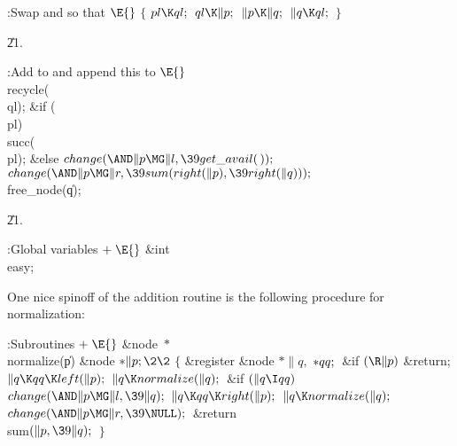 \B{}:Swap  and  so that \X${}\E{}$\6
${}\{{}$\1\6
${}\\{pl}\K\\{ql};{}$\6
${}\\{ql}\K\|p;{}$\6
${}\|p\K\|q;{}$\6
${}\|q\K\\{ql};{}$\6
\4${}\}{}$\2\par
\U21.\fi

\B{}:Add  to  and append this to %
\X${}\E{}$\6
\\{recycle}(\\{ql});\6
\&{if} (\\{pl})\1\5
\\{succ}(\\{pl});\2\6
\&{else}\1\5
${}\\{change}({\AND}\|p\MG\|l,\39\\{get\_avail}(\,));{}$\2\6
${}\\{change}({\AND}\|p\MG\|r,\39\\{sum}(\\{right}(\|p),\39\\{right}(\|q)));{}$%
\6
\\{free\_node}(\|q);\par
\U21.\fi

\B{}:Global variables\X${}\mathrel+\E{}$\6
\&{int} \\{easy};\par
\fi

One nice spinoff of the addition routine is the following procedure
for normalization:

\Y\B\4:Subroutines\X${}\mathrel+\E{}$\6
\&{node} ${}{*}{}$\\{normalize}(\|p)\1\1\6
\&{node} ${}{*}\|p;\2\2{}$\6
${}\{{}$\1\6
\&{register} \&{node} ${}{*}\|q,{}$ ${}{*}\\{qq};{}$\7
\&{if} ${}(\R\|p){}$\1\5
\&{return};\2\6
${}\|q\K\\{qq}\K\\{left}(\|p);{}$\6
${}\|q\K\\{normalize}(\|q);{}$\6
\&{if} ${}(\|q\I\\{qq}){}$\1\5
${}\\{change}({\AND}\|p\MG\|l,\39\|q);{}$\2\6
${}\|q\K\\{qq}\K\\{right}(\|p);{}$\6
${}\|q\K\\{normalize}(\|q);{}$\6
${}\\{change}({\AND}\|p\MG\|r,\39\NULL);{}$\6
\&{return} \\{sum}${}(\|p,\39\|q);{}$\6
\4${}\}{}$\2\par
\fi

